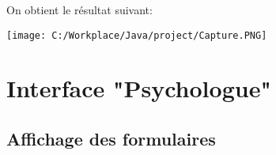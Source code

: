 \documentclass[12]{article}
\begin{document}
On obtient le résultat suivant:

\begin{center}
\texttt{[image: C:/Workplace/Java/project/Capture.PNG]}
\end{center}




\newpage









\section{Interface "Psychologue"}

\subsection{Affichage des formulaires}
\end{document}
